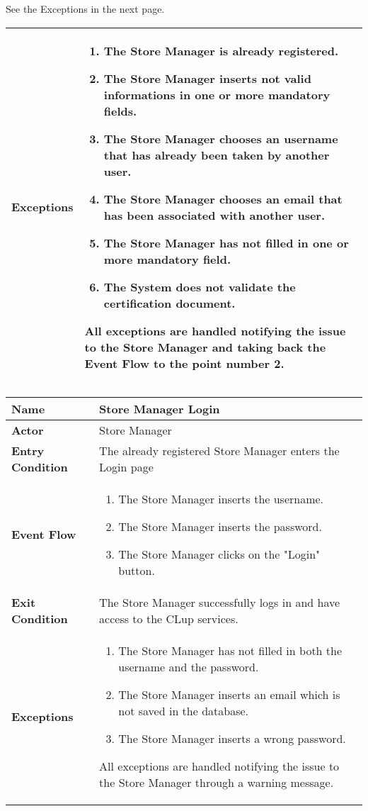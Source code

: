 See the Exceptions in the next page. \\
\begin{center}
    \begin{tabular}{ | l | p{11cm} |}
    \hline
    \textbf{Exceptions} & \begin{enumerate}
					\item The Store Manager is already registered.
					\item The Store Manager inserts not valid informations in one or more mandatory fields.
					\item The Store Manager chooses an username that has already been taken by another user. 
					\item The Store Manager chooses an email that has been associated with another user.
					\item The Store Manager has not filled in one or more mandatory field.
					\item The System does not validate the certification document.
		            \end{enumerate} All exceptions are handled notifying the issue to the Store Manager and taking back the Event Flow to the point number 2.\\  \hline
    \end{tabular}
\end{center}
\begin{center}
    \begin{tabular}{ | l | p{11cm} |}
    \hline
    \textbf{Name} & Store Manager Login \\ \hline
    \textbf{Actor} & Store Manager \\ \hline
    \textbf{Entry Condition} & The already registered Store Manager enters the Login page  \\ \hline
    \textbf{Event Flow} & \begin{enumerate}
					\item The Store Manager inserts the username.
					\item The Store Manager inserts the password.
					\item The Store Manager clicks on the "Login" button.
		            \end{enumerate}\\  \hline
    \textbf{Exit Condition} & The Store Manager successfully logs in and have access to the CLup services.  \\ \hline
    \textbf{Exceptions} & \begin{enumerate}
					\item The Store Manager has not filled in both the username and the password.
					\item The Store Manager inserts an email which is not saved in the database.
					\item The Store Manager inserts a wrong password.
		            \end{enumerate} All exceptions are handled notifying the issue to the Store Manager through a warning message.\\  \hline
				
    \end{tabular}
\end{center} 

